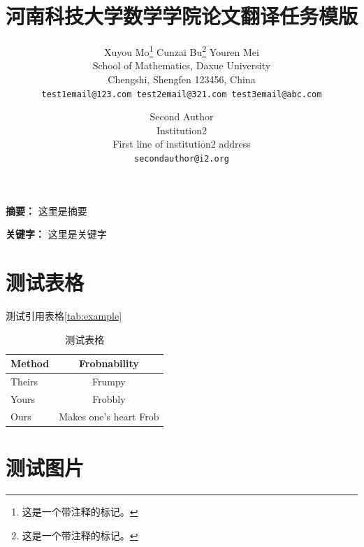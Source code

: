 \documentclass[a4paper,oneside,UTF8]{ctexart} %
\begin{document}
\title{河南科技大学数学学院论文翻译任务模版}

\author{Xuyou Mo\footnote{这是一个带注释的标记。} \quad Cunzai Bu\footnote{这是一个带注释的标记。} \quad Youren Mei \\
School of Mathematics, Daxue University \\
Chengshi, Shengfen 123456, China \\
{\tt\small test1email@123.com \quad test2email@321.com \quad test3email@abc.com}
\and
Second Author\\
Institution2\\
First line of institution2 address\\
{\tt\small secondauthor@i2.org}
}
\date{}
\maketitle

\noindent \textbf{摘要：} 这里是摘要

\noindent \textbf{关键字：} 这里是关键字

\section{测试表格}

测试引用表格\autoref{tab:example}

\begin{table}[htbp]
    \centering
    \begin{tabular}{@{}lc@{}}
        \toprule
        Method & Frobnability           \\
        \midrule
        Theirs & Frumpy                 \\
        Yours  & Frobbly                \\
        Ours   & Makes one's heart Frob \\
        \bottomrule
    \end{tabular}
    \caption{\kaishu{}测试表格}
    \label{tab:example}
\end{table}

\section{测试图片}
\end{document}
